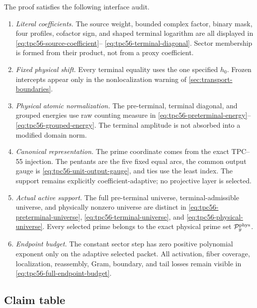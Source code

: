 The proof satisfies the following interface audit.
\begin{enumerate}[label=\textup{(A\arabic*)},leftmargin=3.2em]
 \item \emph{Literal coefficients.}
       The source weight, bounded complex factor, binary mask, four
       profiles, cofactor sign, and shaped terminal logarithm are all
       displayed in
       \eqref{eq:tpc56-source-coefficient}--
       \eqref{eq:tpc56-terminal-diagonal}.  Sector membership is formed
       from their product, not from a proxy coefficient.
 \item \emph{Fixed physical shift.}
       Every terminal equality uses the one specified \(h_0\).  Frozen
       intercepts appear only in the nonlocalization warning of
       \cref{sec:transport-boundaries}.
 \item \emph{Physical atomic normalization.}
       The pre-terminal, terminal diagonal, and grouped energies use raw
       counting measure in
       \eqref{eq:tpc56-preterminal-energy}--
       \eqref{eq:tpc56-grouped-energy}.  The terminal amplitude is not
       absorbed into a modified domain norm.
 \item \emph{Canonical representation.}
       The prime coordinate comes from the exact TPC--55 injection.  The
       pentants are the five fixed equal arcs, the common output gauge is
       \eqref{eq:tpc56-unit-output-gauge}, and ties use the least index.
       The support remains explicitly coefficient-adaptive; no projective
       layer is selected.
 \item \emph{Actual active support.}
       The full pre-terminal universe, terminal-admissible universe, and
       physically nonzero universe are distinct in
       \eqref{eq:tpc56-preterminal-universe},
       \eqref{eq:tpc56-terminal-universe}, and
       \eqref{eq:tpc56-physical-universe}.  Every selected prime belongs to
       the exact physical prime set \(\mathcal P_y^{\rm phys}\).
 \item \emph{Endpoint budget.}
       The constant sector step has zero positive polynomial exponent only
       on the adaptive selected packet.  All activation, fiber coverage,
       localization, reassembly, Gram, boundary, and tail losses remain
       visible in \eqref{eq:tpc56-full-endpoint-budget}.
\end{enumerate}

\subsection{Claim table}

